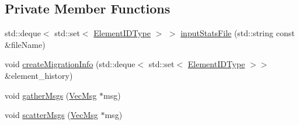 \subsection*{Private Member Functions}
\begin{DoxyCompactItemize}
\item 
std\+::deque$<$ std\+::set$<$ \hyperlink{namespacevt_1_1vrt_1_1collection_1_1balance_a14c8d2c972f2913aa3f1636e5be0a120}{Element\+I\+D\+Type} $>$ $>$ \hyperlink{structvt_1_1vrt_1_1collection_1_1balance_1_1_stats_restart_reader_ae93a904baed4e7e5e8fd85f61848a4ac}{input\+Stats\+File} (std\+::string const \&file\+Name)
\item 
void \hyperlink{structvt_1_1vrt_1_1collection_1_1balance_1_1_stats_restart_reader_a357379003c1041ddcfba382bb9393129}{create\+Migration\+Info} (std\+::deque$<$ std\+::set$<$ \hyperlink{namespacevt_1_1vrt_1_1collection_1_1balance_a14c8d2c972f2913aa3f1636e5be0a120}{Element\+I\+D\+Type} $>$$>$ \&element\+\_\+history)
\item 
void \hyperlink{structvt_1_1vrt_1_1collection_1_1balance_1_1_stats_restart_reader_a7c0adbbe2dd2b7b3f0f42687abe3211e}{gather\+Msgs} (\hyperlink{structvt_1_1vrt_1_1collection_1_1balance_1_1_stats_restart_reader_a7e2a74977e595242bf3abb6c83b7e27b}{Vec\+Msg} $\ast$msg)
\item 
void \hyperlink{structvt_1_1vrt_1_1collection_1_1balance_1_1_stats_restart_reader_a6c355461ab40a4efe65ff3d1351a66d1}{scatter\+Msgs} (\hyperlink{structvt_1_1vrt_1_1collection_1_1balance_1_1_stats_restart_reader_a7e2a74977e595242bf3abb6c83b7e27b}{Vec\+Msg} $\ast$msg)
\end{DoxyCompactItemize}
